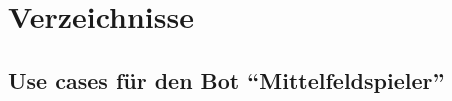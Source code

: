 \documentclass[fontsize=12pt,a4paper,final]{scrartcl}[2003/01/01]
\begin{document}
\section{Verzeichnisse}
\listoffigures

\lstlistoflistings
\printbibliography

\begin{appendices}
\section{Use cases für den Bot ``Mittelfeldspieler''}
\label{usecases_midfielder}

\noindent{}


\end{appendices}
\end{document}
